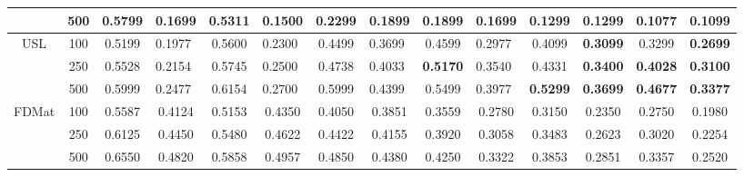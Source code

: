 \documentclass[preprint,12pt]{elsarticle}
\begin{document}
\begin{table}[!t]
{\begin{tabular}{cc|cc|cc|cc|cc|cc|cc}
                          & 500      & 0.5799          & \multicolumn{1}{l|}{0.1699}          & 0.5311          & \multicolumn{1}{l|}{0.1500}          & 0.2299          & \multicolumn{1}{l|}{0.1899}          & 0.1899          & \multicolumn{1}{l|}{0.1699}          & 0.1299          & \multicolumn{1}{l|}{0.1299}          & 0.1077          & 0.1099          \\ \hline
USL                       & 100      & 0.5199          & \multicolumn{1}{l|}{0.1977}          & 0.5600          & \multicolumn{1}{l|}{0.2300}          & 0.4499          & \multicolumn{1}{l|}{0.3699}          & 0.4599          & \multicolumn{1}{l|}{0.2977}          & 0.4099          & \multicolumn{1}{l|}{\textbf{0.3099}} & 0.3299          & \textbf{0.2699} \\
                          & 250      & 0.5528          & \multicolumn{1}{l|}{0.2154}          & 0.5745          & \multicolumn{1}{l|}{0.2500}          & 0.4738          & \multicolumn{1}{l|}{0.4033}          & \textbf{0.5170} & \multicolumn{1}{l|}{0.3540}          & 0.4331          & \multicolumn{1}{l|}{\textbf{0.3400}} & \textbf{0.4028} & \textbf{0.3100} \\
                          & 500      & 0.5999          & \multicolumn{1}{l|}{0.2477}          & 0.6154          & \multicolumn{1}{l|}{0.2700}          & 0.5999          & \multicolumn{1}{l|}{0.4399}          & 0.5499          & \multicolumn{1}{l|}{0.3977}          & \textbf{0.5299} & \multicolumn{1}{l|}{\textbf{0.3699}} & \textbf{0.4677} & \textbf{0.3377} \\ \hline

FDMat           &  100       &  0.5587          &  0.4124                &  0.5153          &  0.4350                &  0.4050          &  0.3851                &  0.3559          &  0.2780                &  0.3150          &  0.2350                &  0.2750          &  0.1980          \\
                          &  250       &  0.6125          &  0.4450                &  0.5480          &  0.4622                &  0.4422          &  0.4155                &  0.3920          &  0.3058                &  0.3483          &  0.2623                &  0.3020          &  0.2254          \\
                          &  500       &  0.6550          &  0.4820                &  0.5858          &  0.4957                &  0.4850          &  0.4380                &  0.4250          &  0.3322                &  0.3853          &  0.2851                &  0.3357          &  0.2520          \\ \hline


\end{tabular}}
\end{table}
\end{document}
